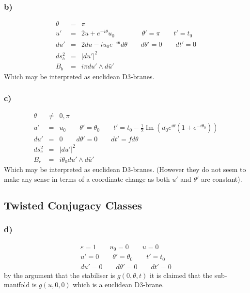 \documentclass[11pt, a4paper]{article}
\DeclareMathOperator{\im}{Im}
\newcommand{\1}{\mathbb{1}}
\begin{document}
\subsubsection{b)}
\begin{eqnarray}
  \label{eq:b}
  \theta&=&\pi\\\nonumber
  u'&=&2u+e^{-i\theta}u_0\qquad\qquad\theta'=\pi\qquad t'=t_0\\\nonumber
  du'&=&2du-iu_0e^{-i\theta}d\theta\qquad d\theta'=0\qquad dt'=0\\\nonumber
  ds^2_b&=&|du'|^2\\\nonumber
  B_b&=&i\pi du'\wedge d\bar u'
\end{eqnarray}
Which may be interpreted as euclidean D3-branes.

\subsubsection{c)}
\begin{eqnarray}
  \label{eq:c}
  \theta&\neq&0,\pi\\\nonumber
  u'&=&u_0\qquad \theta'=\theta_0\qquad t'=t_0-\frac
  12\im(\bar{u_0}e^{i\theta}(1+e^{-i\theta_0}))\\\nonumber
  du'&=&0\qquad d\theta'=0\qquad dt'=fd\theta\\\nonumber
  ds^2_c&=&|du'|^2\\\nonumber
  B_c&=&i\theta_0 du'\wedge d\bar u'
\end{eqnarray}
Which may be interpreted as euclidean D3-branes. (However they do not seem to
make any sense in terms of a coordinate change as both $u'$ and $\theta'$ are
constant).

\subsection{Twisted Conjugacy Classes}
\subsubsection{d)}
\begin{eqnarray}
  \label{eq:d}
  \varepsilon=1\qquad u_0=0\qquad u=0\\\nonumber
  u'=0\qquad \theta'=\theta_0\qquad t'=t_0\\\nonumber
  du'=0\qquad d\theta'=0\qquad dt'=0
\end{eqnarray}
by the argument that the stabiliser is $g(0,\theta,t)$ it is claimed that the
sub-manifold is $g(u,0,0)$ which is a euclidean D3-brane.
\end{document}
